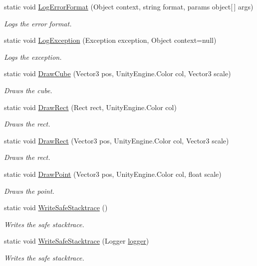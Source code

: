 \begin{DoxyCompactItemize}
static void \hyperlink{class_lerp2_a_p_i_1_1___debug_1_1_debug_af304aa3ecd8197820702562fd4f4b7f8}{Log\+Error\+Format} (Object context, string format, params object\mbox{[}$\,$\mbox{]} args)
\begin{DoxyCompactList}\small\item\em Logs the error format. \end{DoxyCompactList}\item 
static void \hyperlink{class_lerp2_a_p_i_1_1___debug_1_1_debug_ae9812b0b078e03bcdc7807cbc4c4dd24}{Log\+Exception} (Exception exception, Object context=null)
\begin{DoxyCompactList}\small\item\em Logs the exception. \end{DoxyCompactList}\item 
static void \hyperlink{class_lerp2_a_p_i_1_1___debug_1_1_debug_a7c34b61a4680995c4f8cd011c360ddeb}{Draw\+Cube} (Vector3 pos, Unity\+Engine.\+Color col, Vector3 scale)
\begin{DoxyCompactList}\small\item\em Draws the cube. \end{DoxyCompactList}\item 
static void \hyperlink{class_lerp2_a_p_i_1_1___debug_1_1_debug_ae0fd1b937d687418135309334bcd8cda}{Draw\+Rect} (Rect rect, Unity\+Engine.\+Color col)
\begin{DoxyCompactList}\small\item\em Draws the rect. \end{DoxyCompactList}\item 
static void \hyperlink{class_lerp2_a_p_i_1_1___debug_1_1_debug_aed0ee93db824239111441312f30a4607}{Draw\+Rect} (Vector3 pos, Unity\+Engine.\+Color col, Vector3 scale)
\begin{DoxyCompactList}\small\item\em Draws the rect. \end{DoxyCompactList}\item 
static void \hyperlink{class_lerp2_a_p_i_1_1___debug_1_1_debug_a8dec82e886bbc563d7583f70314be9f8}{Draw\+Point} (Vector3 pos, Unity\+Engine.\+Color col, float scale)
\begin{DoxyCompactList}\small\item\em Draws the point. \end{DoxyCompactList}\item 
static void \hyperlink{class_lerp2_a_p_i_1_1___debug_1_1_debug_afdea0e7690332a4809932ba768be6733}{Write\+Safe\+Stacktrace} ()
\begin{DoxyCompactList}\small\item\em Writes the safe stacktrace. \end{DoxyCompactList}\item 
static void \hyperlink{class_lerp2_a_p_i_1_1___debug_1_1_debug_acf68024b1c3e12ffcdaab86efe5cbaec}{Write\+Safe\+Stacktrace} (Logger \hyperlink{class_lerp2_a_p_i_1_1___debug_1_1_debug_a082a2c3e38f54daeeeaaa441927b07c3}{logger})
\begin{DoxyCompactList}\small\item\em Writes the safe stacktrace. \end{DoxyCompactList}\end{DoxyCompactItemize}
